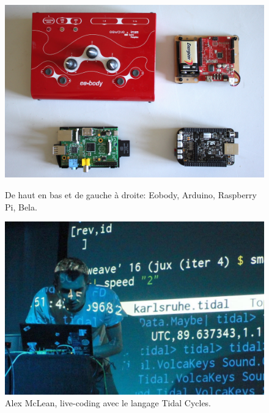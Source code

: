 \begin{figure}[!htbp]
	\captionsetup{format=plain}%
	\centering
	\begin{minipage}[t]{0.48\textwidth}
		\includegraphics[width=\linewidth]{gfx/02_ephemeral/Eobody-arduino-raspi-bela_144px.jpg}
		\caption[Eobody, Arduino, Raspberry Pi, Bela]{De haut en bas et de gauche à droite: Eobody, Arduino, Raspberry Pi, Bela.}
		\label{fig:ephemeral:DIY-devices}
	\end{minipage}
	\hspace{.02\linewidth}
	\begin{minipage}[t]{0.48\textwidth}
	  \includegraphics[width=\linewidth]{gfx/02_ephemeral/alex_mclean_144px.jpg}
		\caption[Alex McLean, live-coding avec le langage Tidal Cycles]{Alex McLean, live-coding avec le langage Tidal Cycles.}
		\label{fig:ephemeral:livecoding}
	\end{minipage}
\end{figure}

